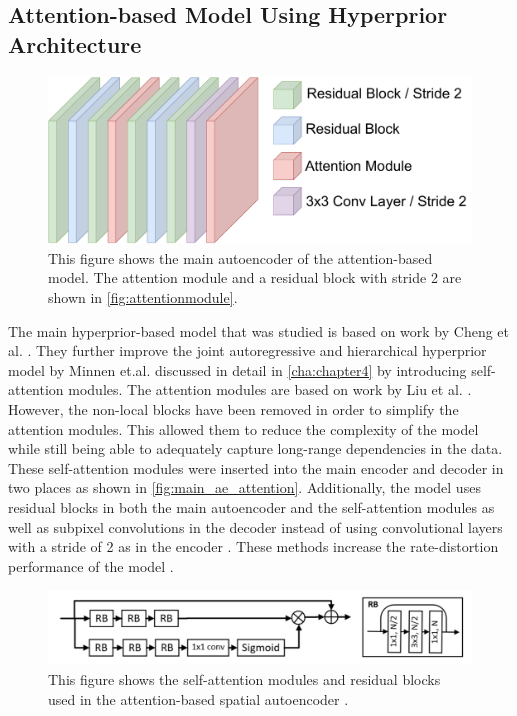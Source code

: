 \subsection{Attention-based Model Using Hyperprior Architecture\label{sec:atthyperprior}}
\begin{figure}
\centering
\includegraphics[scale=0.4]{img/Main_AE_Attention.pdf}
\caption[Main autoencoder of the attention-based model]{This figure shows the main autoencoder of the attention-based model. The attention module and a residual block with stride 2 are shown in \autoref{fig:attentionmodule}.}
\label{fig:main_ae_attention}
\end{figure}
The main hyperprior-based model that was studied is based on work by Cheng et al. \citep{cheng_learned_2020}. They further improve the joint autoregressive and hierarchical hyperprior model by Minnen et.al. \citep{minnen_joint_2018} discussed in detail in \autoref{cha:chapter4} by introducing self-attention modules. The attention modules are based on work by Liu et al. \citep{liu_non-local_2019}. However, the non-local blocks have been removed in order to simplify the attention modules. This allowed them to reduce the complexity of the model while still being able to adequately capture long-range dependencies in the data. These self-attention modules were inserted into the main encoder and decoder in two places as shown in \autoref{fig:main_ae_attention}. Additionally, the model uses residual blocks in both the main autoencoder and the self-attention modules as well as subpixel convolutions in the decoder instead of using convolutional layers with a stride of 2 as in the encoder \citep{cheng_learned_2020}. These methods increase the rate-distortion performance of the model \citep{cheng_learned_2020}.
\begin{figure}
\centering
\includegraphics[scale=0.4]{img/attentionmodule.png}
\caption[Self-attention Module and Residual Block]{This figure shows the self-attention modules and residual blocks used in the attention-based spatial autoencoder \citep{cheng_learned_2020}.}
\label{fig:attentionmodule}
\end{figure}

